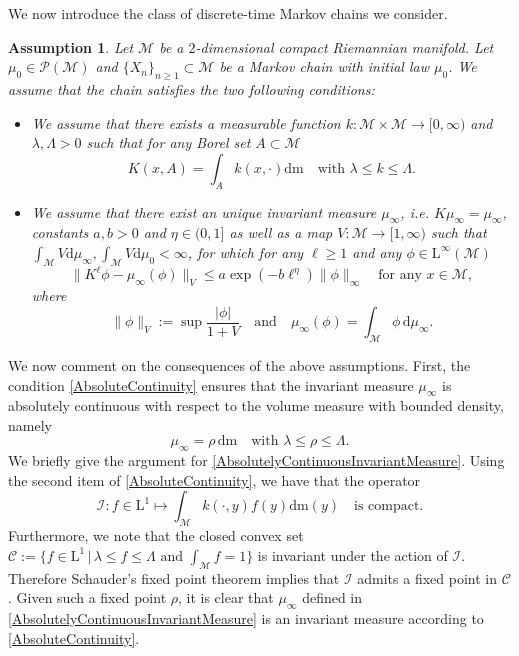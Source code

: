 \documentclass[11pt,a4paper,oneside]{amsart}
\numberwithin{equation}{section}
\newtheorem{assumption}[theorem]{Assumption}
\newcommand{\dd}{\mathrm{d}}
\newcommand{\LL}{\mathrm{L}}
\newcommand{\m}{\mathrm{m}}
\begin{document}
%
\medskip
%

We now introduce the class of discrete-time Markov chains we consider.
%
\begin{assumption}\label{ClassMarkov}
%
Let $\mathcal{M}$ be a $2$-dimensional compact Riemannian manifold. Let $\mu_0\in \mathcal{P}(\mathcal{M})$ and $\{X_n\}_{n\geq 1}\subset \mathcal{M}$ be a Markov chain with initial law $\mu_0$. We assume that the chain satisfies the two following conditions:
%
\begin{itemize}
%
\item[(i)]We assume that there exists a measurable function $k : \mathcal{M}\times\mathcal{M}\rightarrow [0,\infty)$ and $\lambda,\Lambda>0$ such that for any Borel set $A\subset\mathcal{M}$
%
\begin{equation}\label{AbsoluteContinuity}
%
K(x,A)=\int_{A}k(x,\cdot)\dd \m\quad\text{with $\lambda\leq k\leq \Lambda$}.
%
\end{equation}
%
\item[(ii)]We assume that there exist an unique invariant measure $\mu_\infty$, i.e. $K\mu_\infty=\mu_\infty$, constants $a,b>0$ and $\eta\in (0,1]$ as well as a map $V : \mathcal{M}\rightarrow [1,\infty)$ such that $\int_\mathcal{M}V\dd\mu_\infty,\int_{\mathcal{M}}V\dd\mu_0<\infty$, for which for any $\ell\geq 1$ and any 
$\phi\in\LL^\infty(\mathcal{M})$
%
\begin{equation}\label{ConvergenceRate}
%
\|K^\ell\phi-\mu_\infty(\phi)\|_V\leq a\exp(-b\ell^{\eta})\|\phi\|_\infty\quad\text{for any $x\in\mathcal{M}$},
%
\end{equation}
%
where 
%
$$\|\phi\|_V:=\sup \frac{\vert \phi\vert}{1+V}\quad\text{and}\quad\mu_\infty(\phi)=\int_{\mathcal{M}}\phi\,\dd\mu_\infty.$$
%
\end{itemize}
%
\end{assumption}
%
We now comment on the consequences of the above assumptions. First, the condition \eqref{AbsoluteContinuity} ensures that the invariant measure $\mu_\infty$ is absolutely continuous with respect to the volume measure with bounded density, namely
%
\begin{equation}\label{AbsolutelyContinuousInvariantMeasure}
%
\mu_\infty=\rho\,\dd \m\quad\text{with $\lambda\leq \rho\leq \Lambda$.}
%
\end{equation}
%
We briefly give the argument for \eqref{AbsolutelyContinuousInvariantMeasure}. Using the second item of \eqref{AbsoluteContinuity}, we have that the operator 
%
$$\mathcal{I}: f\in\LL^1\mapsto \int_{\mathcal{M}}k(\cdot,y)f(y)\dd\m(y)\quad\text{is compact.}$$
%
Furthermore, we note that the closed convex set $\mathcal{C}:=\{f\in \LL^1\,\vert\, \lambda\leq f\leq \Lambda\text{ and }\int_{\mathcal{M}}f=1\}$ is invariant under the action of $\mathcal{I}$. Therefore Schauder's fixed point theorem implies that $\mathcal{I}$ admits a fixed point in $\mathcal{C}$. Given such a fixed point $\rho$, it is clear that $\mu_\infty$ defined in \eqref{AbsolutelyContinuousInvariantMeasure} is an invariant measure according to \eqref{AbsoluteContinuity}. 
\end{document}
